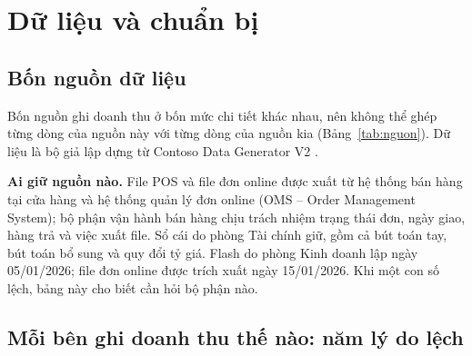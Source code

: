 \section{Dữ liệu và chuẩn bị}

\subsection{Bốn nguồn dữ liệu}

Bốn nguồn ghi doanh thu ở bốn mức chi tiết khác nhau, nên không thể ghép từng dòng của nguồn này với từng dòng của nguồn kia (Bảng~\ref{tab:nguon}). Dữ liệu là bộ giả lập dựng từ Contoso Data Generator V2 \cite{contoso_v2}.

\label{tab:nguon}

\textbf{Ai giữ nguồn nào.} File POS và file đơn online được xuất từ hệ thống bán hàng tại cửa hàng và hệ thống quản lý đơn online (OMS -- Order Management System); bộ phận vận hành bán hàng chịu trách nhiệm trạng thái đơn, ngày giao, hàng trả và việc xuất file. Sổ cái do phòng Tài chính giữ, gồm cả bút toán tay, bút toán bổ sung và quy đổi tỷ giá. Flash do phòng Kinh doanh lập ngày 05/01/2026; file đơn online được trích xuất ngày 15/01/2026. Khi một con số lệch, bảng này cho biết cần hỏi bộ phận nào.

\subsection{Mỗi bên ghi doanh thu thế nào: năm lý do lệch}

